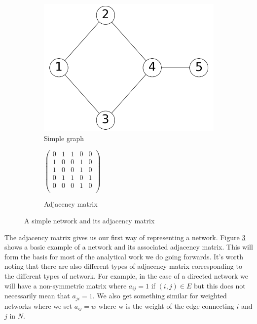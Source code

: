 \begin{figure}
    \begin{center}
        \begin{subfigure}[b]{0.45\textwidth}
            \includegraphics[width=\textwidth]{img/simple_example}
            \caption{Simple graph}
            \label{fig:simple_network}
        \end{subfigure}
        \begin{subfigure}[b]{0.45\textwidth}
            \begin{center}
            $
            \begin{pmatrix}
                0 & 1 & 1 & 0 & 0 \\
                1 & 0 & 0 & 1 & 0 \\
                1 & 0 & 0 & 1 & 0 \\
                0 & 1 & 1 & 0 & 1 \\
                0 & 0 & 0 & 1 & 0 \\
            \end{pmatrix}
            $
            \end{center}
            \caption{Adjacency matrix}
            \label{fig:simple_network_adjacency_matrix}
        \end{subfigure}
    \end{center}
    \caption{A simple network and its adjacency matrix}
    \label{fig:simple_network_and_adjacency_matrix}
\end{figure}

The adjacency matrix gives us our first way of representing a network. Figure \ref{fig:simple_network_and_adjacency_matrix} shows a basic example of a network and its associated adjacency matrix. This will form the basis for most of the analytical work we do going forwards. It's worth noting that there are also different types of adjacency matrix corresponding to the different types of network. For example, in the case of a directed network we will have a non-symmetric matrix where $a_{ij} = 1$ if $(i, j) \in E$ but this does not necessarily mean that $a_{ji} = 1$. We also get something similar for weighted networks where we set $a_{ij} = w$ where w is the weight of the edge connecting $i$ and $j$ in $N$.

